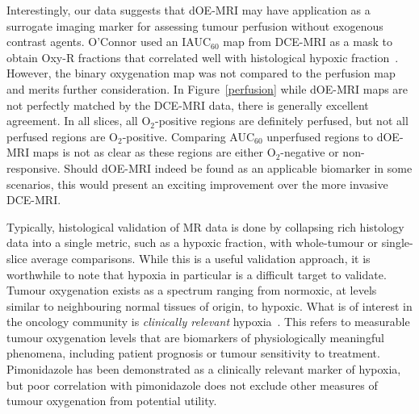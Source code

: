 Interestingly, our data suggests that dOE-MRI may have application as a surrogate imaging marker for assessing tumour perfusion without exogenous contrast agents.
O'Connor used an IAUC$_{60}$ map from DCE-MRI as a mask to obtain Oxy-R fractions that correlated well with histological hypoxic fraction~\cite{OConnor:2016ee}.
However, the binary oxygenation map was not compared to the perfusion map and merits further consideration.
In Figure~\ref{perfusion} while dOE-MRI maps are not perfectly matched by the DCE-MRI data, there is generally excellent agreement.
In all slices, all O$_2$-positive regions are definitely perfused, but not all perfused regions are O$_2$-positive.
Comparing AUC$_{60}$ unperfused regions to dOE-MRI maps is not as clear as these regions are either O$_2$-negative or non-responsive.
Should dOE-MRI indeed be found as an applicable biomarker in some scenarios, this would present an exciting improvement over the more invasive DCE-MRI.

Typically, histological validation of MR data is done by collapsing rich histology data into a single metric, such as a hypoxic fraction, with whole-tumour or single-slice average comparisons.
While this is a useful validation approach, it is worthwhile to note that hypoxia in particular is a difficult target to validate.
Tumour oxygenation exists as a spectrum ranging from normoxic, at levels similar to neighbouring normal tissues of origin, to hypoxic.
What is of interest in the oncology community is \emph{clinically relevant} hypoxia~\cite{Horsman:2012kw}.
This refers to measurable tumour oxygenation levels that are biomarkers of physiologically meaningful phenomena, including patient prognosis or tumour sensitivity to treatment.
Pimonidazole has been demonstrated as a clinically relevant marker of hypoxia, but poor correlation with pimonidazole does not exclude other measures of tumour oxygenation from potential utility.

